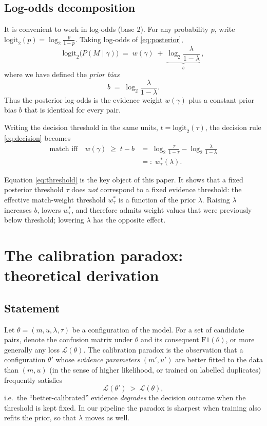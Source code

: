 \documentclass[conference]{IEEEtran}
\begin{document}
\subsection{Log-odds decomposition}
It is convenient to work in log-odds (base 2). For any probability $p$, write
$\mathrm{logit}_2(p)=\log_2\frac{p}{1-p}$. Taking log-odds of \eqref{eq:posterior},
\begin{equation}
\mathrm{logit}_2\bigl(P(M\mid\gamma)\bigr)
\;=\;w(\gamma)\;+\;\underbrace{\log_2\frac{\lambda}{1-\lambda}}_{b}\,,
\label{eq:logodds}
\end{equation}
where we have defined the \emph{prior bias}
\begin{equation}
b\;=\;\log_2\frac{\lambda}{1-\lambda}.
\end{equation}
Thus the posterior log-odds is the evidence weight $w(\gamma)$ plus a constant prior bias
$b$ that is identical for every pair.

Writing the decision threshold in the same units, $t=\mathrm{logit}_2(\tau)$, the decision
rule \eqref{eq:decision} becomes
\begin{equation}
\begin{split}
\text{match iff}\quad w(\gamma)\;\ge\;t-b &=\; \log_2\frac{\tau}{1-\tau}-\log_2\frac{\lambda}{1-\lambda}\\
&=:\; w_\tau^*(\lambda).
\end{split}
\label{eq:threshold}
\end{equation}

Equation \eqref{eq:threshold} is the key object of this paper. It shows that a fixed
posterior threshold $\tau$ does \emph{not} correspond to a fixed evidence threshold: the
effective match-weight threshold $w_\tau^*$ is a function of the prior $\lambda$. Raising
$\lambda$ increases $b$, lowers $w_\tau^*$, and therefore admits weight values that were
previously below threshold; lowering $\lambda$ has the opposite effect.

\section{The calibration paradox: theoretical derivation}
\label{sec:paradox}

\subsection{Statement}
Let $\theta=(m,u,\lambda,\tau)$ be a configuration of the model. For a set of candidate
pairs, denote the confusion matrix under $\theta$ and its consequent
$\mathrm{F1}(\theta)$, or more generally any loss $\mathcal{L}(\theta)$. The calibration
paradox is the observation that a configuration $\theta'$ whose \emph{evidence parameters}
$(m',u')$ are better fitted to the data than $(m,u)$ (in the sense of higher likelihood, or
trained on labelled duplicates) frequently satisfies
\begin{equation}
\mathcal{L}(\theta')\ >\ \mathcal{L}(\theta),
\end{equation}
i.e.\ the ``better-calibrated'' evidence \emph{degrades} the decision outcome when the
threshold is kept fixed. In our pipeline the paradox is sharpest when training also
refits the prior, so that $\lambda$ moves as well.
\end{document}

